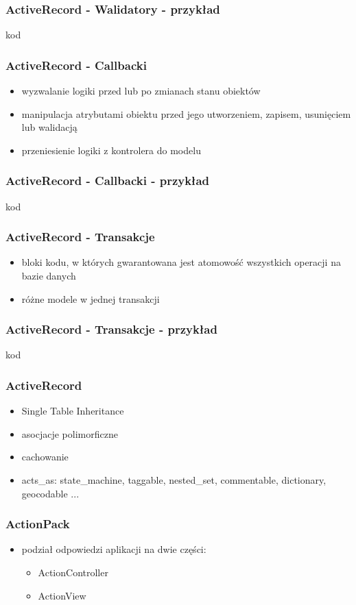 \documentclass[12t]{beamer}
\begin{document}
\begin{frame}
  \frametitle{ActiveRecord - Walidatory - przykład}
  kod
\end{frame}

\begin{frame}
  \frametitle{ActiveRecord - Callbacki}
  \begin{itemize}
  \item wyzwalanie logiki przed lub po zmianach stanu obiektów
  \item manipulacja atrybutami obiektu przed jego utworzeniem, zapisem, usunięciem lub walidacją
  \item przeniesienie logiki z kontrolera do modelu
  \end{itemize}
\end{frame}

\begin{frame}
  \frametitle{ActiveRecord - Callbacki - przykład}
  kod
\end{frame}

\begin{frame}
  \frametitle{ActiveRecord - Transakcje}
  \begin{itemize}
  \item bloki kodu, w których gwarantowana jest atomowość wszystkich operacji na bazie danych
  \item różne modele w jednej transakcji
  \end{itemize}
\end{frame}

\begin{frame}
  \frametitle{ActiveRecord - Transakcje - przykład}
  kod
\end{frame}

\begin{frame}
  \frametitle{ActiveRecord}
  \begin{itemize}
  \item Single Table Inheritance
  \item asocjacje polimorficzne
  \item cachowanie
  \item acts\_as: state\_machine, taggable, nested\_set, commentable, dictionary, geocodable ...
  \end{itemize}
\end{frame}

\begin{frame}
  \frametitle{ActionPack}
  \begin{itemize}
  \item podział odpowiedzi aplikacji na dwie części:
    \begin{itemize}
    \item ActionController
    \item ActionView
    \end{itemize}
  \end{itemize}
\end{frame}
\end{document}
